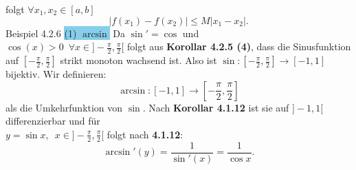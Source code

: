 \documentclass[landscape, 10pt]{article}
\begin{document}
\begin{multicols}{3}
                            folgt \textcolor{NavyBlue}{ 
                            $\forall x_1,x_2\in[a,b]$}
                            \begin{equation*}
                                   |f(x_1)-f(x_2)|
                                   \leqslant M|x_1-x_2|.
                            \end{equation*}
              \colorbox{Dandelion}{Beispiel 4.2.6}
                     \colorbox{SkyBlue}{(1) $\arcsin$} 
                            Da \textcolor{NavyBlue}{
                            $\sin'=\cos$} und \\
                            \textcolor{NavyBlue}{
                            $\cos(x)>0\enspace
                            \forall x\in]-\frac{\pi}{2},
                            \frac{\pi}{2}[$}
                            folgt aus 
                            \textbf{Korollar 4.2.5 (4)}, dass die 
                            Sinusfunktion auf
                            \textcolor{NavyBlue}{
                            $[-\frac{\pi}{2},\frac{\pi}{2}]$} 
                            strikt monoton wachsend
                            ist. Also ist 
                            \textcolor{NavyBlue}{
                            $\sin:[-\frac{\pi}{2},
                            \frac{\pi}{2}]\longrightarrow[-1,1]$}
                            bijektiv. Wir definieren:
                            \begin{equation*}
                                   \arcsin:[-1,1]\longrightarrow
                                   [-\frac{\pi}{2},\frac{\pi}{2}]
                            \end{equation*}
                            als die Umkehrfunktion von
                            \textcolor{NavyBlue}{
                            $\sin$}. Nach 
                            \textbf{Korollar 4.1.12} 
                            ist sie auf $]-1,1[$ 
                            differenzierbar und für\\
                            \textcolor{NavyBlue}{
                            $y=\sin x,\enspace 
                            x\in]-\frac{\pi}{2},\frac{\pi}{2}[$}
                            folgt nach \textbf{4.1.12}:
                            \begin{equation*}
                                   \arcsin'(y)
                                   =\frac{1}{\sin'(x)}
                                   =\frac{1}{\cos x}.
                            \end{equation*}

\end{multicols}
\end{document}
